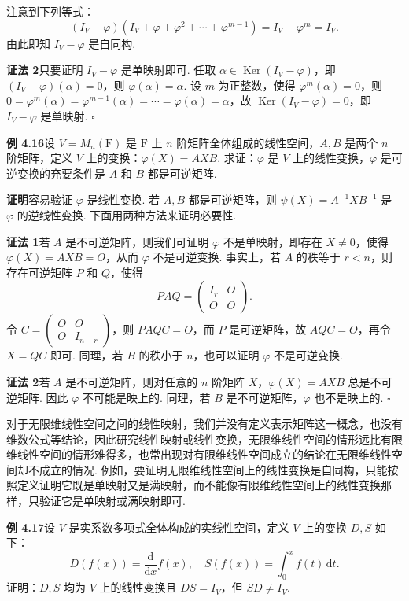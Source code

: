 \documentclass[UTF8, 12pt, fontset=fandol, oneside]{ctexart}
\begin{document}
注意到下列等式：
\[
(I_V-\varphi)(I_V+\varphi+\varphi^2+\cdots+\varphi^{m-1})=I_V-\varphi^m=I_V.
\]
由此即知 $I_V-\varphi$ 是自同构.

\noindent\textbf{证法 2}\quad 只要证明 $I_V-\varphi$ 是单映射即可. 任取 $\alpha\in\operatorname{Ker}(I_V-\varphi)$，即 $(I_V-\varphi)(\alpha)=0$，则 $\varphi(\alpha)=\alpha$. 设 $m$ 为正整数，使得 $\varphi^m(\alpha)=0$，则 $0=\varphi^m(\alpha)=\varphi^{m-1}(\alpha)=\cdots=\varphi(\alpha)=\alpha$，故 $\operatorname{Ker}(I_V-\varphi)=0$，即 $I_V-\varphi$ 是单映射. $\square$

\noindent\textbf{例 4.16}\quad 设 $V=M_n(\mathrm{F})$ 是 $\mathrm{F}$ 上 $n$ 阶矩阵全体组成的线性空间，$A,B$ 是两个 $n$ 阶矩阵，定义 $V$ 上的变换：$\varphi(X)=AXB$. 求证：$\varphi$ 是 $V$ 上的线性变换，$\varphi$ 是可逆变换的充要条件是 $A$ 和 $B$ 都是可逆矩阵.

\noindent\textbf{证明}\quad 容易验证 $\varphi$ 是线性变换. 若 $A,B$ 都是可逆矩阵，则 $\psi(X)=A^{-1}XB^{-1}$ 是 $\varphi$ 的逆线性变换. 下面用两种方法来证明必要性.

\noindent\textbf{证法 1}\quad 若 $A$ 是不可逆矩阵，则我们可证明 $\varphi$ 不是单映射，即存在 $X\ne0$，使得 $\varphi(X)=AXB=O$，从而 $\varphi$ 不是可逆变换. 事实上，若 $A$ 的秩等于 $r<n$，则存在可逆矩阵 $P$ 和 $Q$，使得
\[
PAQ=\left(\begin{array}{cc}
I_r & O\\
O & O
\end{array}\right).
\]
令 $C=\left(\begin{array}{cc}O&O\\ O&I_{n-r}\end{array}\right)$，则 $PAQC=O$，而 $P$ 是可逆矩阵，故 $AQC=O$，再令 $X=QC$ 即可. 同理，若 $B$ 的秩小于 $n$，也可以证明 $\varphi$ 不是可逆变换.

\noindent\textbf{证法 2}\quad 若 $A$ 是不可逆矩阵，则对任意的 $n$ 阶矩阵 $X$，$\varphi(X)=AXB$ 总是不可逆矩阵. 因此 $\varphi$ 不可能是映上的. 同理，若 $B$ 是不可逆矩阵，$\varphi$ 也不是映上的. $\square$

对于无限维线性空间之间的线性映射，我们并没有定义表示矩阵这一概念，也没有维数公式等结论，因此研究线性映射或线性变换，无限维线性空间的情形远比有限维线性空间的情形难得多，也常出现对有限维线性空间成立的结论在无限维线性空间却不成立的情况. 例如，要证明无限维线性空间上的线性变换是自同构，只能按照定义证明它既是单映射又是满映射，而不能像有限维线性空间上的线性变换那样，只验证它是单映射或满映射即可.

\noindent\textbf{例 4.17}\quad 设 $V$ 是实系数多项式全体构成的实线性空间，定义 $V$ 上的变换 $D,S$ 如下：
\[
D(f(x))=\frac{\mathrm{d}}{\mathrm{d}x}f(x),\quad S(f(x))=\int_0^x f(t)\,\mathrm{d}t.
\]
证明：$D,S$ 均为 $V$ 上的线性变换且 $DS=I_V$，但 $SD\ne I_V$.
\end{document}
